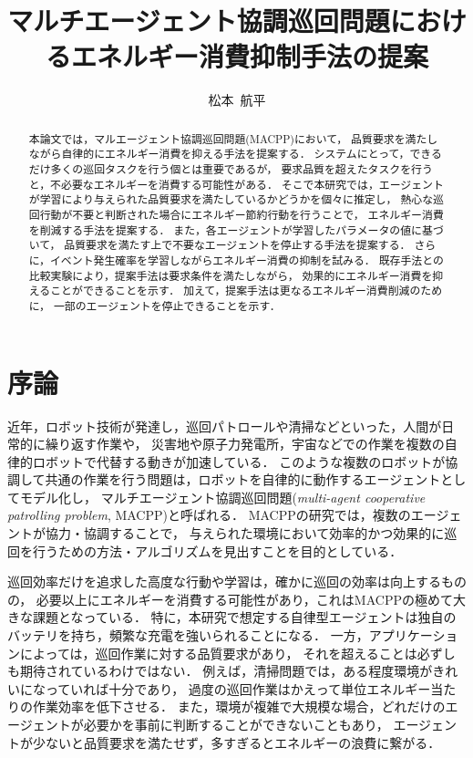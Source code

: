 \documentclass[12pt,a4j,twoside]{jarticle}
\title{マルチエージェント協調巡回問題におけるエネルギー消費抑制手法の提案}{5}
\author{松本~航平}
\begin{document}
\maketitle

\begin{abstract}
  本論文では，マルエージェント協調巡回問題(MACPP)において，
  品質要求を満たしながら自律的にエネルギー消費を抑える手法を提案する．
  システムにとって，できるだけ多くの巡回タスクを行う個とは重要であるが，
  要求品質を超えたタスクを行うと，不必要なエネルギーを消費する可能性がある．
  そこで本研究では，エージェントが学習により与えられた品質要求を満たしているかどうかを個々に推定し，
  熱心な巡回行動が不要と判断された場合にエネルギー節約行動を行うことで，
  エネルギー消費を削減する手法を提案する．
  また，各エージェントが学習したパラメータの値に基づいて，
  品質要求を満たす上で不要なエージェントを停止する手法を提案する．
  さらに，イベント発生確率を学習しながらエネルギー消費の抑制を試みる．
  既存手法との比較実験により，提案手法は要求条件を満たしながら，
  効果的にエネルギー消費を抑えることができることを示す．
  加えて，提案手法は更なるエネルギー消費削減のために，
  一部のエージェントを停止できることを示す．
\end{abstract}

\vspace*{1cm}\par
\section{序論}\label{sec:introduction}
近年，ロボット技術が発達し，巡回パトロールや清掃などといった，人間が日常的に繰り返す作業や，
災害地や原子力発電所，宇宙などでの作業を複数の自律的ロボットで代替する動きが加速している．
このような複数のロボットが協調して共通の作業を行う問題は，ロボットを自律的に動作するエージェントとしてモデル化し，
マルチエージェント協調巡回問題({\em multi-agent cooperative patrolling problem}, MACPP)と呼ばれる．
MACPPの研究では，複数のエージェントが協力・協調することで，
与えられた環境において効率的かつ効果的に巡回を行うための方法・アルゴリズムを見出すことを目的としている．
\par

巡回効率だけを追求した高度な行動や学習は，確かに巡回の効率は向上するものの，
必要以上にエネルギーを消費する可能性があり，これはMACPPの極めて大きな課題となっている．
特に，本研究で想定する自律型エージェントは独自のバッテリを持ち，頻繁な充電を強いられることになる．
一方，アプリケーションによっては，巡回作業に対する品質要求があり，
それを超えることは必ずしも期待されているわけではない．
例えば，清掃問題では，ある程度環境がきれいになっていれば十分であり，
過度の巡回作業はかえって単位エネルギー当たりの作業効率を低下させる．
また，環境が複雑で大規模な場合，どれだけのエージェントが必要かを事前に判断することができないこともあり，
エージェントが少ないと品質要求を満たせず，多すぎるとエネルギーの浪費に繋がる．
\par
\end{document}
